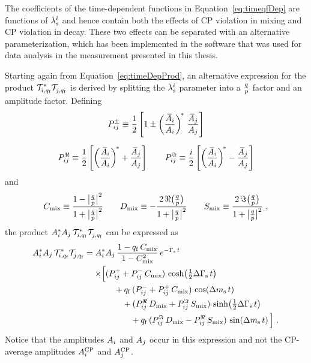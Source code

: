 The coefficients of the time-dependent functions in Equation~\ref{eq:timeqfDep} are functions of $\lamsi$ and hence contain both the
effects of CP violation in mixing and CP violation in decay. These two effects can be separated with an alternative parameterization, which
has been implemented in the software that was used for data analysis in the measurement presented in this thesis.

Starting again from Equation~\ref{eq:timeDepProd}, an alternative expression for the product
$\timeAmp[i,\qf]^*\timeAmp[j,\qf]^{\phantom{*}}$ is derived by splitting the $\lamsi$ parameter into a $\qpAlt$ factor and an amplitude
factor. Defining
\begin{equation}
  \label{eq:decayRho}
  \begin{gathered}
    \Ppm \equiv \frac{1}{2} \left[ 1 \pm \left(\frac{\Abari}{\Ai}\right)^{\!*}\, \frac{\Abari[j]}{\Ai[j]} \right] \\[0.6em]
    \Pre \equiv \frac{1}{2} \left[ \left(\frac{\Abari}{\Ai}\right)^{\!*} + \frac{\Abari[j]}{\Ai[j]} \right] \quad\quad
    \Pim \equiv \frac{i}{2} \left[ \left(\frac{\Abari}{\Ai}\right)^{\!*} - \frac{\Abari[j]}{\Ai[j]} \right]
  \end{gathered}
\end{equation}
and
\begin{equation}
  \label{eq:mixCDS}
  \Cm \equiv \frac{1-\qpAbsAlt^2}{1+\qpAbsAlt^2}
  \qquad \Dm \equiv -\frac{2\,\Re\big(\qpAlt\big)}{1+\qpAbsAlt^2}
  \qquad \Sm \equiv  \frac{2\,\Im\big(\qpAlt\big)}{1+\qpAbsAlt^2}
  \ ,
\end{equation}
the product $\Ai^*\Ai[j]\,\timeAmp[i,\qf]^*\timeAmp[j,\qf]^{\phantom{*}}$ can be expressed as
\begin{equation}
  \label{eq:timeqfDepSep}
  \begin{aligned}
    \Ai^*\Ai[j]\,\timeAmp[i,\qf]^*\timeAmp[j,\qf]^{\phantom{*}} =
      \Ai^*&\Ai[j]\, \frac{1-\qf\,\Cm}{1-\Cm^2}\, \eGst \\
        \times\Big[ &(\Ppl+\Pmn\,\Cm)\,\cDGs \\
                    &\quad + \qf\,(\Pmn+\Ppl\,\Cm)\,\cDms \\
                    &\quad\quad + (\Pre\,\Dm+\Pim\,\Sm)\,\sDGs \\
                    &\quad\quad\quad + \qf\,(\Pim\,\Dm-\Pre\,\Sm)\,\sDms \Big] \ .
  \end{aligned}
\end{equation}
Notice that the amplitudes $\Ai$ and $\Ai[j]$ occur in this expression and not the CP-average amplitudes $\AAv$ and $\AAv[{\Ai[j]}]$.

